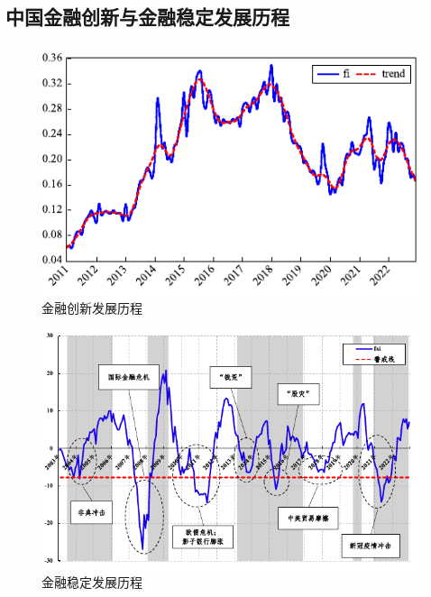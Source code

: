 \documentclass[12pt,aspectratio=169]{ctexbeamer}
\begin{document}
			\subsection{中国金融创新与金融稳定发展历程}
			\begin{frame}
				\frametitle{}
				\centering
				\begin{minipage}{0.45\textwidth}
					\begin{figure}
						\centering
						\includegraphics[width=\textwidth]{figures/fig.2-1}
						\caption{金融创新发展历程}
						\label{fi2}
					\end{figure}
				\end{minipage}
				\hspace{5mm}
				\begin{minipage}{0.45\textwidth}
					\begin{figure}
						\centering
						\includegraphics[width=\textwidth]{figures/fig.4-1}
						\caption{金融稳定发展历程}
						\label{fsi2}
					\end{figure}
				\end{minipage}	
			\end{frame}
			
\end{document}
